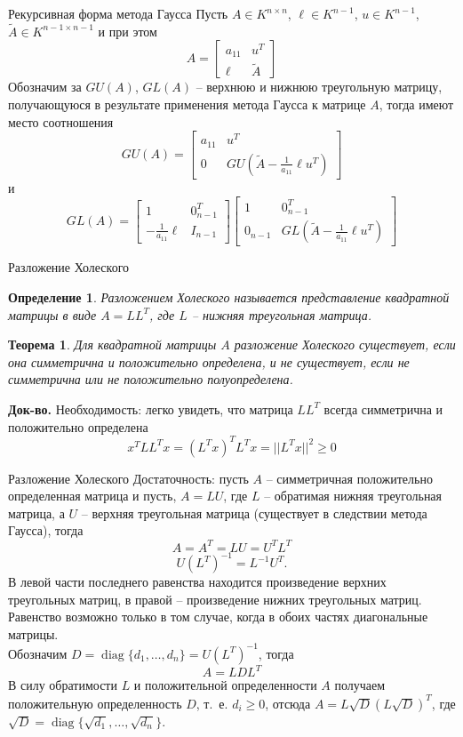 \documentclass[10pt]{beamer}
\DeclareMathOperator{\diag}{diag}
\newcounter{thm}
\newcounter{def}
\newtheorem{theorem_ru}[thm]{Теорема}
\newtheorem{definition_ru}{Определение}[def]
\begin{document}
\begin{frame}{Рекурсивная форма метода Гаусса}
Пусть $A\in K^{n\times n}$, $\ell\in K^{n-1
}$, $u\in K^{n-1}$, $\tilde{A}\in K^{n-1\times n-1}$ и при этом
$$
A=\left[\begin{array}{cc}
a_{11} & u^T \\
\ell & \tilde{A}
\end{array}
\right]
$$
\pause
Обозначим за $GU(A)$, $GL(A)$ -- верхнюю и нижнюю треугольную матрицу, получающуюся в результате применения метода Гаусса к матрице $A$, тогда имеют место соотношения
$$
GU(A)=\left[\begin{array}{cc}
a_{11} & u^T \\
0 & GU(\tilde{A}-\frac{1}{a_{11}}\ell u^T)
\end{array}
\right]
$$
и
$$
GL(A)=\left[\begin{array}{cc}
1 & 0_{n-1}^T \\
-\frac{1}{a_{11}}\ell & I_{n-1}
\end{array}
\right]
\left[\begin{array}{cc}
1 & 0^T_{n-1} \\
0_{n-1} & GL(\tilde{A}-\frac{1}{a_{11}}\ell u^T)
\end{array}\right]
$$
\end{frame}

\begin{frame}{Разложение Холеского}
\begin{definition_ru}
Разложением \textit{Холеского} называется представление квадратной матрицы в виде $A=LL^T$, где $L$ -- нижняя треугольная матрица.
\end{definition_ru}
\pause
\begin{theorem_ru}
Для квадратной матрицы $A$ разложение Холеского существует, если она симметрична и положительно определена, и не существует, если не симметрична или не положительно полуопределена.
\end{theorem_ru}
\pause
\textbf{Док-во.} Необходимость: легко увидеть, что матрица $LL^T$ всегда симметрична и положительно определена
$$
x^TLL^Tx=(L^Tx)^TL^Tx=||L^Tx||^2\geq 0
$$
\end{frame}

\begin{frame}{Разложение Холеского}
Достаточность: пусть $A$ -- симметричная положительно определенная матрица и пусть, $A=LU$, где $L$ -- обратимая нижняя треугольная матрица, а $U$ -- верхняя треугольная матрица (существует в следствии метода Гаусса), тогда
$$
A=A^T=LU=U^TL^T
$$
\pause
$$
U(L^T)^{-1}=L^{-1}U^T.
$$
\pause
В левой части последнего равенства находится произведение верхних треугольных матриц, в правой -- произведение нижних треугольных матриц. Равенство возможно только в том случае, когда в обоих частях диагональные матрицы. \\
\pause
\vspace{1em}
Обозначим $D=\diag\{d_1, \ldots, d_n\}=U(L^T)^{-1}$, тогда
$$
A=LDL^T
$$
\pause
В силу обратимости $L$ и положительной определенности $A$ получаем положительную определенность $D$, т.~е. $d_i\geq 0$, отсюда $A=L\sqrt{D}(L\sqrt{D})^T$, где $\sqrt{D}=\diag\{\sqrt{d_1}, \ldots, \sqrt{d_n}\}$.

\end{frame}
\end{document}
